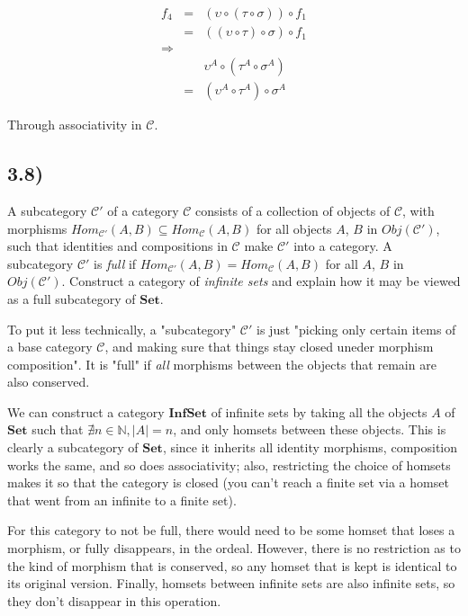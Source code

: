 $$
\begin{aligned}
f_4 &=& ( \upsilon \circ (\tau  \circ \sigma)) \circ f_1 \\
	&=& ((\upsilon \circ  \tau) \circ \sigma ) \circ f_1 \\
\Rightarrow && \\
    & &  \upsilon^A \circ (\tau^A  \circ \sigma^A) \\
    &=& (\upsilon^A \circ  \tau^A) \circ \sigma^A
\end{aligned}
$$

Through associativity in $\mathcal{C}$.


\subsection*{3.8)}

A subcategory $\mathcal{C'}$ of a category $\mathcal{C}$ consists of a collection of objects of $\mathcal{C}$, with morphisms $Hom_\mathcal{C'} (A, B) \subseteq Hom_\mathcal{C} (A, B)$ for all objects $A$, $B$ in $Obj(\mathcal{C'})$, such that identities and compositions in $\mathcal{C}$ make $\mathcal{C'}$ into a category. A subcategory $\mathcal{C'}$ is \textit{full} if $Hom_\mathcal{C'} (A, B) = Hom_\mathcal{C} (A, B)$ for all $A$, $B$ in $Obj(\mathcal{C'})$. Construct a category of \textit{infinite sets} and explain how it may be viewed as a full subcategory of $\mathbf{Set}$.

To put it less technically, a "subcategory" $\mathcal{C'}$ is just "picking only certain items of a base category $\mathcal{C}$, and making sure that things stay closed uneder morphism composition". It is "full" if \textit{all} morphisms between the objects that remain are also conserved.

We can construct a category $\mathbf{InfSet}$ of infinite sets by taking all the objects $A$ of $\mathbf{Set}$ such that $\nexists n \in \mathbb{N}, |A| = n$, and only homsets between these objects. This is clearly a subcategory of $\mathbf{Set}$, since it inherits all identity morphisms, composition works the same, and so does associativity; also, restricting the choice of homsets makes it so that the category is closed (you can't reach a finite set via a homset that went from an infinite to a finite set).

For this category to not be full, there would need to be some homset that loses a morphism, or fully disappears, in the ordeal. However, there is no restriction as to the kind of morphism that is conserved, so any homset that is kept is identical to its original version. Finally, homsets between infinite sets are also infinite sets, so they don't disappear in this operation.

